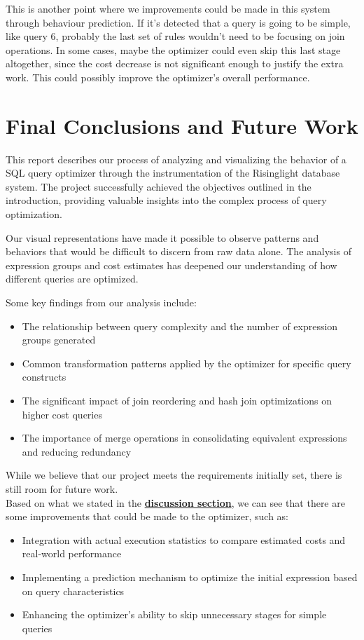 \documentclass[a4paper,12pt]{scrreprt}
\begin{document}
This is another point where we improvements could be made in this system through behaviour prediction. If it's detected that a query is going to be simple, like query 6, probably the last set of rules wouldn't need to be focusing on join operations. In some cases, maybe the optimizer could even skip this last stage altogether, since the cost decrease is not significant enough to justify the extra work. This could possibly improve the optimizer's overall performance.


\chapter{Final Conclusions and Future Work} \label{chap:concl}
\thispagestyle{fancy}
This report describes our process of analyzing and visualizing the behavior of a SQL query optimizer through the instrumentation of the Risinglight database system. The project successfully achieved the objectives outlined in the introduction, providing valuable insights into the complex process of query optimization.

Our visual representations have made it possible to observe patterns and behaviors that would be difficult to discern from raw data alone. The analysis of expression groups and cost estimates has deepened our understanding of how different queries are optimized.

Some key findings from our analysis include:
\begin{itemize}
    \item The relationship between query complexity and the number of expression groups generated
    \item Common transformation patterns applied by the optimizer for specific query constructs
    \item The significant impact of join reordering and hash join optimizations on higher cost queries
    \item The importance of merge operations in consolidating equivalent expressions and reducing redundancy
\end{itemize}

While we believe that our project meets the requirements initially set, there is still room for future work.\\ 
Based on what we stated in the \textbf{\hyperref[chap:discussion]{discussion section}}, we can see that there are some improvements that could be made to the optimizer, such as:
\begin{itemize}
    \item Integration with actual execution statistics to compare estimated costs and real-world performance
    \item Implementing a prediction mechanism to optimize the initial expression based on query characteristics
    \item Enhancing the optimizer's ability to skip unnecessary stages for simple queries
\end{itemize}
\end{document}

